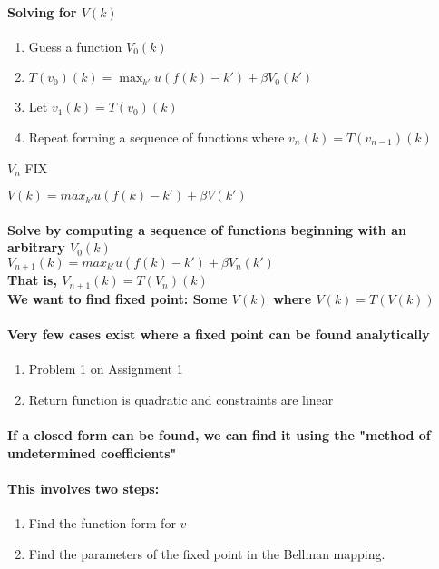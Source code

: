 \documentclass{article}
\begin{document}
\paragraph{Solving for $V(k)$}
\begin {enumerate}
\item Guess a function $V_0(k)$
\item $T(v_0)(k) = \max_{k'} u(f(k) - k') + \beta V_0(k')$
\item Let $v_1(k) = T(v_0)(k)$
\item Repeat forming a sequence of functions where $v_n(k) = T(v_{n-1})(k)$
\end{enumerate}

${V_n}$ FIX

$ V(k) = max_{k'} u(f(k) - k') + \beta V(k')$

\paragraph{Solve by computing a sequence of functions beginning with
an arbitrary $V_0(k)$\\
$V_{n+1}(k) = max_{k'} u(f(k) - k') + \beta V_n(k')$\\
That is, $V_{n+1}(k) = T(V_n)(k)$\\
We want to find fixed point: Some $V(k)$ where $V(k) = T(V(k))$}

\paragraph{Very few cases exist where a fixed point can be found analytically}
\begin{enumerate}
    \item Problem 1 on Assignment 1
    \item Return function is quadratic and constraints are linear
\end{enumerate}
\paragraph{If a closed form can be found, we can find it using the "method of undetermined coefficients"}
\paragraph{This involves two steps:}
\begin{enumerate}
    \item Find the function form for $v$
    \item Find the parameters of the fixed point in the Bellman mapping.
\end{enumerate}
\end{document}
